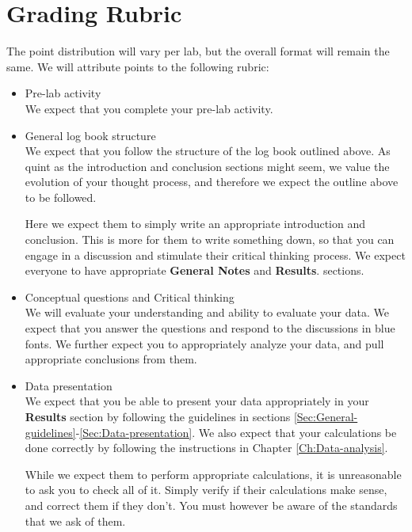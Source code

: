 \documentclass[12pt]{report}
\begin{document}
\section{Grading Rubric}
The point distribution will vary per lab, but the overall format will remain the same. We will attribute points to the following rubric:
\begin{itemize}
\item Pre-lab activity \\
We expect that you complete your pre-lab activity.

\item General log book structure \\
We expect that you follow the structure of the log book outlined above. As quint as the introduction and conclusion sections might seem, we value the evolution of your thought process, and therefore we expect the outline above to be followed.

\begin{tcolorbox}
Here we expect them to simply write an appropriate introduction and conclusion. This is more for them to write something down, so that you can engage in a discussion and stimulate their critical thinking process.
We expect everyone to have appropriate \textbf{General Notes} and \textbf{Results}. sections.
\end{tcolorbox}

\item Conceptual questions and Critical thinking \\
We will evaluate your understanding and ability to evaluate your data. {\color{blue} We expect that you answer the questions and respond to the discussions in blue fonts.}
We further expect you to appropriately analyze your data, and pull appropriate conclusions from them.

\item Data presentation \\
We expect that you be able to present your data appropriately in your \textbf{Results} section by following the guidelines in sections \ref{Sec:General-guidelines}-\ref{Sec:Data-presentation}. We also expect that your calculations be done correctly by following the instructions in Chapter \ref{Ch:Data-analysis}.

\begin{tcolorbox}
While we expect them to perform appropriate calculations, it is unreasonable to ask you to check all of it. Simply verify if their calculations make sense, and correct them if they don't. You must however be aware of the standards that we ask of them.
\end{tcolorbox}

\end{itemize}
\end{document}
